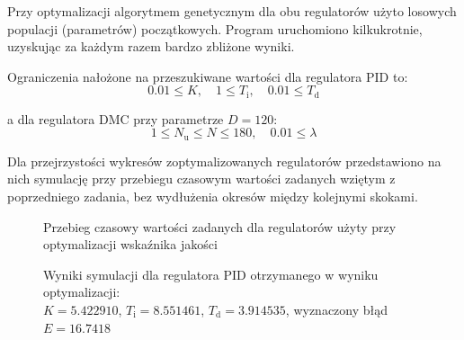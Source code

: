 Przy optymalizacji algorytmem genetycznym dla obu regulatorów użyto losowych populacji (parametrów) początkowych. Program uruchomiono kilkukrotnie, uzyskując za każdym razem bardzo zbliżone wyniki. 

Ograniczenia nałożone na przeszukiwane wartości dla regulatora PID to:
\begin{equation}
	0.01 \le K, \quad
	1 \le T_\mathrm{i},\quad
	0.01 \le T_\mathrm{d}
\end{equation}

a dla regulatora DMC przy parametrze $D=120$:
\begin{equation}
	1 \le N_\mathrm{u} \le N \le 180, \quad 
	0.01 \le \lambda
\end{equation}


Dla przejrzystości wykresów zoptymalizowanych regulatorów przedstawiono na nich symulację przy przebiegu czasowym wartości zadanych wziętym z poprzedniego zadania, bez wydłużenia okresów między kolejnymi skokami.

\begin{figure}[ht]
\centering
{}
\caption{Przebieg czasowy wartości zadanych dla regulatorów użyty przy optymalizacji wskaźnika jakości}
\label{Z6optimizedPID}
\end{figure}

\begin{figure}[ht]
\centering
{}
\caption{Wyniki symulacji dla regulatora PID otrzymanego w wyniku optymalizacji:\\ $K=\num{5,422910}$, $T_{\mathrm{i}}=\num{8,551461}$, $T_{\mathrm{d}}=\num{3,914535}$, wyznaczony błąd $E=\num{16,7418}$}
\label{Z6optimizedPID}
\end{figure}

